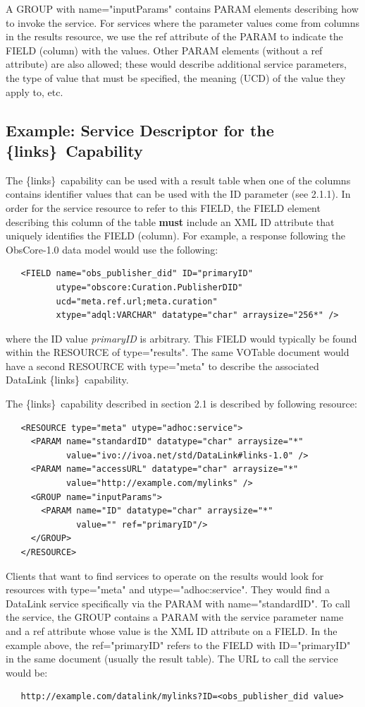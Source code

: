 \documentclass[11pt,a4paper]{ivoa}
\newcommand{\blinks}{\{links\}}
\begin{document}
A GROUP with name="inputParams" contains PARAM elements describing
how to invoke the service. For services where the parameter values
come from columns in the results resource, we use the ref attribute of
the PARAM to indicate the FIELD (column) with the values. Other PARAM
elements (without a ref attribute) are also allowed; these would describe
additional service parameters, the type of value that must be specified,
the meaning (UCD) of the value they apply to, etc.


\subsection{Example: Service Descriptor for the \blinks\ Capability}

The \blinks\ capability can be used with a result table when one of the
columns contains identifier values that can be used with the ID parameter
(see 2.1.1). In order for the service resource to refer to this FIELD,
the FIELD element describing this column of the table
{\bf must} include an XML ID attribute
that uniquely identifies the FIELD (column).
For example, a response following the ObsCore-1.0 data model
would use the following:
\begin{verbatim}
   <FIELD name="obs_publisher_did" ID="primaryID"
          utype="obscore:Curation.PublisherDID"
          ucd="meta.ref.url;meta.curation"
          xtype="adql:VARCHAR" datatype="char" arraysize="256*" />
\end{verbatim}
where the ID value {\em primaryID\/} is arbitrary.
This FIELD would typically
be found within the RESOURCE of type="results". The same VOTable
document would have a second RESOURCE with type="meta" to describe
the associated DataLink \blinks\ capability.

The \blinks\ capability described in section 2.1 is described
by following resource:
\begin{verbatim}
   <RESOURCE type="meta" utype="adhoc:service">
     <PARAM name="standardID" datatype="char" arraysize="*"
            value="ivo://ivoa.net/std/DataLink#links-1.0" />
     <PARAM name="accessURL" datatype="char" arraysize="*"
            value="http://example.com/mylinks" />
     <GROUP name="inputParams">
       <PARAM name="ID" datatype="char" arraysize="*"
              value="" ref="primaryID"/>
     </GROUP>
   </RESOURCE>
\end{verbatim}

Clients that want to find services to operate on the results would look
for resources with type="meta" and utype="adhoc:service". They
would find a DataLink service specifically via the PARAM with
name="standardID". To call the service, the GROUP contains a PARAM
with the service parameter name and a ref attribute whose value is the
XML ID attribute on a FIELD. In the example above, the ref="primaryID"
refers to the FIELD with ID="primaryID" in the same document (usually
the result table). The URL to call the service would be:
\begin{verbatim}
   http://example.com/datalink/mylinks?ID=<obs_publisher_did value>
\end{verbatim}
\end{document}
